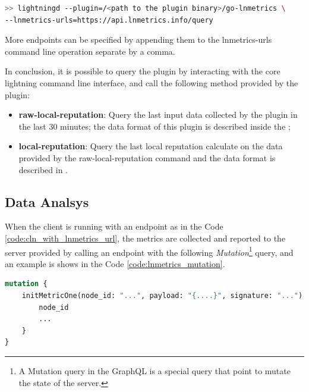 \begin{lstlisting}[language=bash, basicstyle=\small,
                  caption={Command to run core lightning with the lnmetrics plugin an publish the data.}, 
                  label={code:cln_with_lnmetrics_url}]
>> lightningd --plugin=/<path to the plugin binary>/go-lnmetrics \ 
--lnmetrics-urls=https://api.lnmetrics.info/query
\end{lstlisting}

More endpoints can be specified by appending them to the lnmetrics-urls command line operation separate by a comma.

In conclusion, it is possible to query the plugin by interacting with the core lightning command line interface,
and call the following method provided by the plugin:

\begin{itemize}
    \item {\bf raw-local-reputation}: Query the last input data collected by the plugin in the last 30 minutes; 
        the data format of this plugin is described inside the \cite{lnmetrics_localreputation};
    \item {\bf local-reputation}: Query the last local reputation calculate on the data provided by the 
        raw-local-reputation command and the data format is described in \cite{lnmetrics_localreputation}.
\end{itemize}

\subsection{Data Analsys}

When the client is running with an endpoint as in the Code \ref{code:cln_with_lnmetrics_url},
the metrics are collected and reported to the server provided by calling an endpoint with the following 
\emph{Mutation}\footnote{A Mutation query in the GraphQL is a special query that point to mutate the state of the server.} query, 
and an example is shows in the Code \ref{code:lnmetrics_mutation}.

\begin{lstlisting}[language=graphql, basicstyle=\small,
                  caption={Mutation query call by the client to initialize the metric on the server.}, 
                  label={code:lnmetrics_mutation}]
mutation {
    initMetricOne(node_id: "...", payload: "{....}", signature: "...") {
        node_id
        ...
    }
}
\end{lstlisting}

